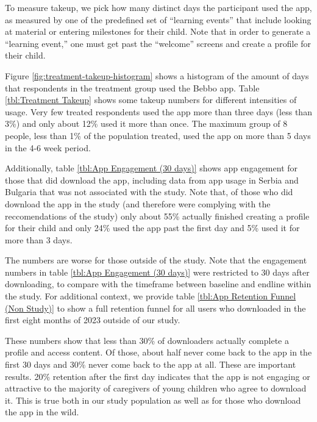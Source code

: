 \documentclass{article}
\begin{document}
To measure takeup, we pick how many distinct days the participant used the app, as measured by one of the predefined set of ``learning events'' that include looking at material or entering milestones for their child. Note that in order to generate a ``learning event,'' one must get past the ``welcome'' screens and create a profile for their child.

Figure \ref{fig:treatment-takeup-histogram} shows a histogram of the amount of days that respondents in the treatment group used the Bebbo app. Table \ref{tbl:Treatment Takeup} shows some takeup numbers for different intensities of usage. Very few treated respondents used the app more than three days (less than 3\%) and only about 12\% used it more than once. The maximum group of 8 people, less than 1\% of the population treated, used the app on more than 5 days in the 4-6 week period.

Additionally, table \ref{tbl:App Engagement (30 days)} shows app engagement for those that did download the app, including data from app usage in Serbia and Bulgaria that was not associated with the study. Note that, of those who did download the app in the study (and therefore were complying with the reccomendations of the study) only about 55\% actually finished creating a profile for their child and only 24\% used the app past the first day and 5\% used it for more than 3 days.

The numbers are worse for those outside of the study. Note that the engagement numbers in table \ref{tbl:App Engagement (30 days)} were restricted to 30 days after downloading, to compare with the timeframe between baseline and endline within the study. For additional context, we provide table \ref{tbl:App Retention Funnel (Non Study)} to show a full retention funnel for all users who downloaded in the first eight months of 2023 outside of our study.

These numbers show that less than 30\% of downloaders actually complete a profile and access content. Of those, about half never come back to the app in the first 30 days and 30\% never come back to the app at all. These are important results. 20\% retention after the first day indicates that the app is not engaging or attractive to the majority of caregivers of young children who agree to download it. This is true both in our study population as well as for those who download the app in the wild.
\end{document}
